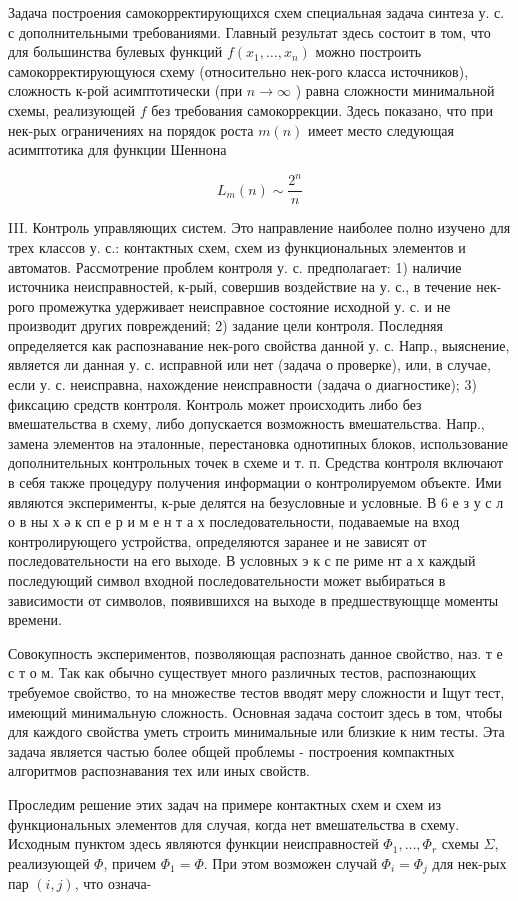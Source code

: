 \documentclass[10pt]{article}
\begin{document}
Задача построения самокорректирующихся схем специальная задача синтеза у. с. с дополнительными требованиями. Главный результат здесь состоит в том, что для большинства булевых функций $f\left(x_{1}, \ldots, x_{n}\right)$ можно построить самокорректирующуюся схему (относительно нек-рого класса источников), сложность к-рой асимптотически (при $n \rightarrow \infty$ ) равна сложности минимальной схемы, реализующей $f$ без требования самокоррекции. Здесь показано, что при нек-рых ограничениях на порядок роста $m(n)$ имеет место следующая асимптотика для функции Шеннона



\[

L_{m}(n) \sim \frac{2^{n}}{n}

\]



III. Контроль управляющих систем. Это направление наиболее полно изучено для трех классов у. с.: контактных схем, схем из функциональных элементов и автоматов. Рассмотрение проблем контроля у. с. предполагает: 1) наличие источника неисправностей, к-рый, совершив воздействие на у. с., в течение нек-рого промежутка удерживает неисправное состояние исходной у. с. и не производит других повреждений; 2) задание цели контроля. Последняя определяется как распознавание нек-рого свойства данной у. с. Напр., выяснение, является ли данная у. с. исправной или нет (задача о проверке), или, в случае, если у. с. неисправна, нахождение неисправности (задача о диагностике); 3) фиксацию средств контроля. Контроль может происходить либо без вмешательства в схему, либо допускается возможность вмешательства. Напр., замена элементов на эталонные, перестановка однотипных блоков, использование дополнительных контрольных точек в схеме и т. п. Средства контроля включают в себя также процедуру получения информации о контролируемом объекте. Ими являются эксперименты, к-рые делятся на безусловные и условные. В 6 е з у с л о в ны х ә к сп е р и м е н т а х последовательности, подаваемые на вход контролирующего устройства, определяются заранее и не зависят от последовательности на его выходе. В условных э к с пе риме нт а х каждый последующий символ входной последовательности может выбираться в зависимости от символов, появившихся на выходе в предшествующще моменты времени.



Совокупность экспериментов, позволяющая распознать данное свойство, наз. т е с т о м. Так как обычно существует много различных тестов, распознающих требуемое свойство, то на множестве тестов вводят меру сложности и Іщут тест, имеющий минимальную сложность. Основная задача состоит здесь в том, чтобы для каждого свойства уметь строить минимальные или близкие к ним тесты. Эта задача является частью более общей проблемы - построения компактных алгоритмов распознавания тех или иных свойств.



Проследим решение этих задач на примере контактных схем и схем из функциональных элементов для случая, когда нет вмешательства в схему. Исходным пунктом здесь являются функции неисправностей $\Phi_{1}, \ldots, \Phi_{r}$ схемы $\Sigma$, реализующей $\Phi$, причем $\Phi_{1}=\Phi$. При этом возможен случай $\Phi_{i}=\Phi_{j}$ для нек-рых пар $(i, j)$, что означа-
\end{document}
